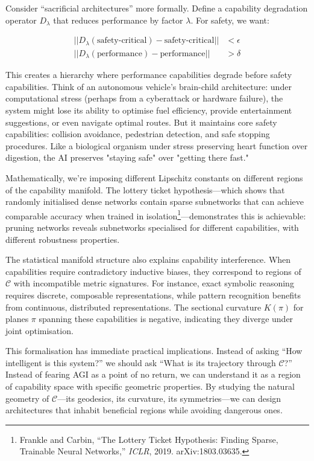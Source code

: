 \documentclass[acmsmall,screen]{acmart}
\begin{document}
Consider ``sacrificial architectures'' more formally. Define a capability degradation operator $D_\lambda$ that reduces performance by factor $\lambda$. For safety, we want:

\begin{align}
||D_\lambda(\text{safety-critical}) - \text{safety-critical}|| &< \epsilon \\
||D_\lambda(\text{performance}) - \text{performance}|| &> \delta
\end{align}

This creates a hierarchy where performance capabilities degrade before safety capabilities. Think of an autonomous vehicle's brain-child architecture: under computational stress (perhaps from a cyberattack or hardware failure), the system might lose its ability to optimise fuel efficiency, provide entertainment suggestions, or even navigate optimal routes. But it maintains core safety capabilities: collision avoidance, pedestrian detection, and safe stopping procedures. Like a biological organism under stress preserving heart function over digestion, the AI preserves "staying safe" over "getting there fast."

Mathematically, we're imposing different Lipschitz constants on different regions of the capability manifold. The lottery ticket hypothesis---which shows that randomly initialised dense networks contain sparse subnetworks that can achieve comparable accuracy when trained in isolation\footnote{Frankle and Carbin, ``The Lottery Ticket Hypothesis: Finding Sparse, Trainable Neural Networks,'' \textit{ICLR}, 2019. arXiv:1803.03635.}---demonstrates this is achievable: pruning networks reveals subnetworks specialised for different capabilities, with different robustness properties.

The statistical manifold structure also explains capability interference. When capabilities require contradictory inductive biases, they correspond to regions of $\mathcal{C}$ with incompatible metric signatures. For instance, exact symbolic reasoning requires discrete, composable representations, while pattern recognition benefits from continuous, distributed representations. The sectional curvature $K(\pi)$ for planes $\pi$ spanning these capabilities is negative, indicating they diverge under joint optimisation.

This formalisation has immediate practical implications. Instead of asking ``How intelligent is this system?'' we should ask ``What is its trajectory through $\mathcal{C}$?'' Instead of fearing AGI as a point of no return, we can understand it as a region of capability space with specific geometric properties. By studying the natural geometry of $\mathcal{C}$---its geodesics, its curvature, its symmetries---we can design architectures that inhabit beneficial regions while avoiding dangerous ones.
\end{document}

